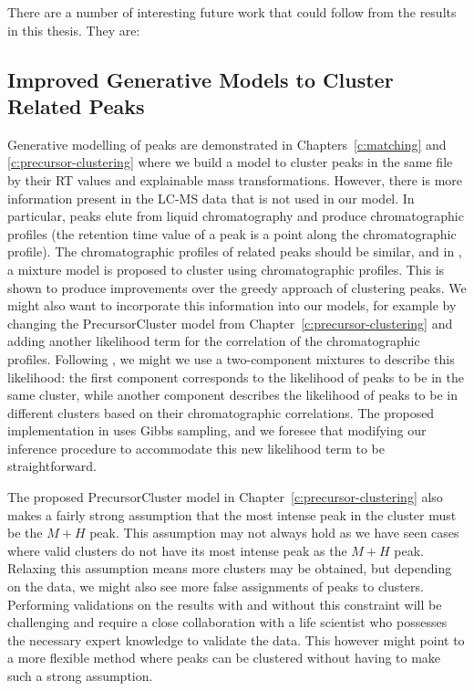 There are a number of interesting future work that could follow from the results in this thesis. They are:

\subsection{Improved Generative Models to Cluster Related Peaks}

Generative modelling of peaks are demonstrated in Chapters~\ref{c:matching} and \ref{c:precursor-clustering} where we build a model to cluster peaks in the same file by their RT values and explainable mass transformations. However, there is more information present in the LC-MS data that is not used in our model. In particular, peaks elute from liquid chromatography and produce chromatographic profiles (the retention time value of a peak is a point along the chromatographic profile). The chromatographic profiles of related peaks should be similar, and in \cite{Rogers2012}, a mixture model is proposed to cluster using chromatographic profiles. This is shown to produce improvements over the greedy approach of clustering peaks. We might also want to incorporate this information into our models, for example by changing the PrecursorCluster model from Chapter~\ref{c:precursor-clustering} and adding another likelihood term for the correlation of the chromatographic profiles. Following \cite{Rogers2012}, we might we use a two-component mixtures to describe this likelihood: the first component corresponds to the likelihood of peaks to be in the same cluster, while another component describes the likelihood of peaks to be in different clusters based on their chromatographic correlations. The proposed implementation in \cite{Rogers2012} uses Gibbs sampling, and we foresee that modifying our inference procedure to accommodate this new likelihood term to be straightforward.

The proposed PrecursorCluster model in Chapter~\ref{c:precursor-clustering} also makes a fairly strong assumption that the most intense peak in the cluster must be the $M+H$ peak. This assumption may not always hold as we have seen cases where valid clusters do not have its most intense peak as the $M+H$ peak. Relaxing this assumption means more clusters may be obtained, but depending on the data, we might also see more false assignments of peaks to clusters. Performing validations on the results with and without this constraint will be challenging and require a close collaboration with a life scientist who possesses the necessary expert knowledge to validate the data. This however might point to a more flexible method where peaks can be clustered without having to make such a strong assumption.

